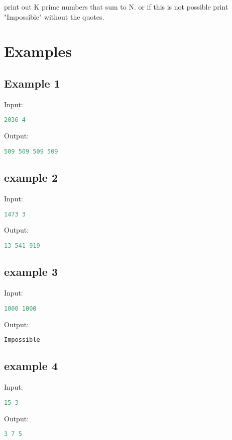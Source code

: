 \documentclass[10pt]{article}
\begin{document}
print out K prime numbers that sum to N. or if this is not possible print "Impossible" without the quotes.

\section{Examples}
\subsection{Example 1}
Input:
\begin{lstlisting}[language=Python]
2036 4
\end{lstlisting}
Output:
\begin{lstlisting}[language=Python]
509 509 509 509 
\end{lstlisting}
\subsection{example 2}
Input:
\begin{lstlisting}[language=Python]
1473 3
\end{lstlisting}
Output:
\begin{lstlisting}[language=Python]
13 541 919
\end{lstlisting}
\subsection{example 3}
Input:
\begin{lstlisting}[language=Python]
1000 1000
\end{lstlisting}
Output:
\begin{lstlisting}[language=Python]
Impossible
\end{lstlisting}
\subsection{example 4}
Input:
\begin{lstlisting}[language=Python]
15 3
\end{lstlisting}
Output:
\begin{lstlisting}[language=Python]
3 7 5
\end{lstlisting}
\end{document}
